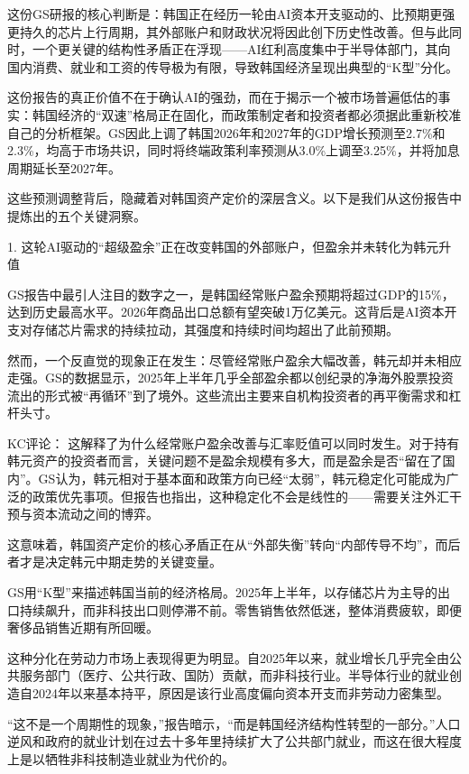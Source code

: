 \documentclass[11pt]{ctexart}
\begin{document}
这份GS研报的核心判断是：韩国正在经历一轮由AI资本开支驱动的、比预期更强更持久的芯片上行周期，其外部账户和财政状况将因此创下历史性改善。但与此同时，一个更关键的结构性矛盾正在浮现——AI红利高度集中于半导体部门，其向国内消费、就业和工资的传导极为有限，导致韩国经济呈现出典型的“K型”分化。

这份报告的真正价值不在于确认AI的强劲，而在于揭示一个被市场普遍低估的事实：韩国经济的“双速”格局正在固化，而政策制定者和投资者都必须据此重新校准自己的分析框架。GS因此上调了韩国2026年和2027年的GDP增长预测至2.7\%和2.3\%，均高于市场共识，同时将终端政策利率预测从3.0\%上调至3.25\%，并将加息周期延长至2027年。

这些预测调整背后，隐藏着对韩国资产定价的深层含义。以下是我们从这份报告中提炼出的五个关键洞察。

1. 这轮AI驱动的“超级盈余”正在改变韩国的外部账户，但盈余并未转化为韩元升值

GS报告中最引人注目的数字之一，是韩国经常账户盈余预期将超过GDP的15\%，达到历史最高水平。2026年商品出口总额有望突破1万亿美元。这背后是AI资本开支对存储芯片需求的持续拉动，其强度和持续时间均超出了此前预期。

然而，一个反直觉的现象正在发生：尽管经常账户盈余大幅改善，韩元却并未相应走强。GS的数据显示，2025年上半年几乎全部盈余都以创纪录的净海外股票投资流出的形式被“再循环”到了境外。这些流出主要来自机构投资者的再平衡需求和杠杆头寸。

KC评论： 这解释了为什么经常账户盈余改善与汇率贬值可以同时发生。对于持有韩元资产的投资者而言，关键问题不是盈余规模有多大，而是盈余是否“留在了国内”。GS认为，韩元相对于基本面和政策方向已经“太弱”，韩元稳定化可能成为广泛的政策优先事项。但报告也指出，这种稳定化不会是线性的——需要关注外汇干预与资本流动之间的博弈。

这意味着，韩国资产定价的核心矛盾正在从“外部失衡”转向“内部传导不均”，而后者才是决定韩元中期走势的关键变量。

GS用“K型”来描述韩国当前的经济格局。2025年上半年，以存储芯片为主导的出口持续飙升，而非科技出口则停滞不前。零售销售依然低迷，整体消费疲软，即便奢侈品销售近期有所回暖。

这种分化在劳动力市场上表现得更为明显。自2025年以来，就业增长几乎完全由公共服务部门（医疗、公共行政、国防）贡献，而非科技行业。半导体行业的就业创造自2024年以来基本持平，原因是该行业高度偏向资本开支而非劳动力密集型。

“这不是一个周期性的现象，”报告暗示，“而是韩国经济结构性转型的一部分。”人口逆风和政府的就业计划在过去十多年里持续扩大了公共部门就业，而这在很大程度上是以牺牲非科技制造业就业为代价的。
\end{document}
